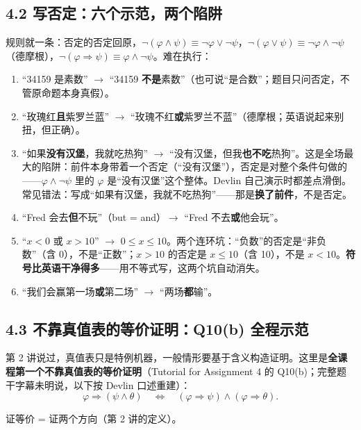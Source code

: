 \documentclass[UTF8,a4paper,11pt]{ctexart}
\begin{document}
\subsection*{4.2 写否定：六个示范，两个陷阱}

规则就一条：否定的否定回原，$\neg(\varphi \land \psi) \equiv \neg \varphi \lor \neg \psi$，$\neg(\varphi \lor \psi) \equiv \neg \varphi \land \neg \psi$（德摩根），$\neg(\varphi \Rightarrow \psi) \equiv \varphi \land \neg \psi$。难在执行：

\begin{enumerate}
  \item “34159 是素数” $\rightarrow$ “34159 \textbf{不是}素数”（也可说“是合数”；题目只问否定，不管原命题本身真假）。
  \item “玫瑰红\textbf{且}紫罗兰蓝” $\rightarrow$ “玫瑰不红\textbf{或}紫罗兰不蓝”（德摩根；英语说起来别扭，但正确）。
  \item “如果\textbf{没有汉堡}，我就吃热狗” $\rightarrow$ “没有汉堡，但我\textbf{也不吃}热狗”。这是全场最大的陷阱：前件本身带着一个否定（“没有汉堡”），否定是对整个条件句做的——$\varphi \land \neg\psi$ 里的 $\varphi$ 是“没有汉堡”这个整体。Devlin 自己演示时都差点滑倒。常见错法：写成“如果有汉堡，我就不吃热狗”——那是\textbf{换了前件}，不是否定。
  \item “Fred 会去\textbf{但}不玩”（but = and）$\rightarrow$ “Fred 不去\textbf{或}他会玩”。
  \item “$x < 0$ 或 $x > 10$” $\rightarrow$ $0 \le x \le 10$。两个连环坑：“负数”的否定是“非负数”（含 0），不是“正数”；$x > 10$ 的否定是 $x \le 10$（含 10），不是 $x < 10$。\textbf{符号比英语干净得多}——用不等式写，这两个坑自动消失。
  \item “我们会赢第一场\textbf{或}第二场” $\rightarrow$ “两场\textbf{都}输”。
\end{enumerate}

\subsection*{4.3 不靠真值表的等价证明：Q10(b) 全程示范}

第 2 讲说过，真值表只是特例机器，一般情形要基于含义构造证明。这里是\textbf{全课程第一个不靠真值表的等价证明}（Tutorial for Assignment 4 的 Q10(b)；完整题干字幕未明说，以下按 Devlin 口述重建）：
\[
\varphi \Rightarrow (\psi \land \theta) \quad\Longleftrightarrow\quad (\varphi \Rightarrow \psi) \land (\varphi \Rightarrow \theta) .
\]

证等价 = 证两个方向（第 2 讲的定义）。
\end{document}
